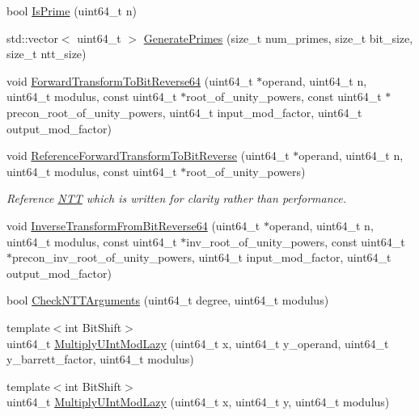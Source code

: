 \begin{DoxyCompactItemize}
bool \hyperlink{namespacehetest_1_1utils_a406b9fa0a830692fe69b04d2e9023858}{Is\-Prime} (uint64\-\_\-t n)
\item 
std\-::vector$<$ uint64\-\_\-t $>$ \hyperlink{namespacehetest_1_1utils_aa12bfb4bcbbd50266e460de87ee58cd5}{Generate\-Primes} (size\-\_\-t num\-\_\-primes, size\-\_\-t bit\-\_\-size, size\-\_\-t ntt\-\_\-size)
\item 
void \hyperlink{namespacehetest_1_1utils_a603d76eecc147f0388bfd3d4ed56a80e}{Forward\-Transform\-To\-Bit\-Reverse64} (uint64\-\_\-t $\ast$operand, uint64\-\_\-t n, uint64\-\_\-t modulus, const uint64\-\_\-t $\ast$root\-\_\-of\-\_\-unity\-\_\-powers, const uint64\-\_\-t $\ast$precon\-\_\-root\-\_\-of\-\_\-unity\-\_\-powers, uint64\-\_\-t input\-\_\-mod\-\_\-factor, uint64\-\_\-t output\-\_\-mod\-\_\-factor)
\item 
void \hyperlink{namespacehetest_1_1utils_a17097893112c25d41b68a2469e348c97}{Reference\-Forward\-Transform\-To\-Bit\-Reverse} (uint64\-\_\-t $\ast$operand, uint64\-\_\-t n, uint64\-\_\-t modulus, const uint64\-\_\-t $\ast$root\-\_\-of\-\_\-unity\-\_\-powers)
\begin{DoxyCompactList}\small\item\em Reference \hyperlink{classhetest_1_1utils_1_1NTT}{N\-T\-T} which is written for clarity rather than performance. \end{DoxyCompactList}\item 
void \hyperlink{namespacehetest_1_1utils_aab875bdc62d230db2837749ab27c3f4f}{Inverse\-Transform\-From\-Bit\-Reverse64} (uint64\-\_\-t $\ast$operand, uint64\-\_\-t n, uint64\-\_\-t modulus, const uint64\-\_\-t $\ast$inv\-\_\-root\-\_\-of\-\_\-unity\-\_\-powers, const uint64\-\_\-t $\ast$precon\-\_\-inv\-\_\-root\-\_\-of\-\_\-unity\-\_\-powers, uint64\-\_\-t input\-\_\-mod\-\_\-factor, uint64\-\_\-t output\-\_\-mod\-\_\-factor)
\item 
bool \hyperlink{namespacehetest_1_1utils_af721dbd58c61bb7b9220c8bb315488a9}{Check\-N\-T\-T\-Arguments} (uint64\-\_\-t degree, uint64\-\_\-t modulus)
\item 
{\footnotesize template$<$int Bit\-Shift$>$ }\\uint64\-\_\-t \hyperlink{namespacehetest_1_1utils_af874c3ebc0c27f720a19c5f8e4ea288c}{Multiply\-U\-Int\-Mod\-Lazy} (uint64\-\_\-t x, uint64\-\_\-t y\-\_\-operand, uint64\-\_\-t y\-\_\-barrett\-\_\-factor, uint64\-\_\-t modulus)
\item 
{\footnotesize template$<$int Bit\-Shift$>$ }\\uint64\-\_\-t \hyperlink{namespacehetest_1_1utils_a6d381530e44b937b604ee7f44c841a21}{Multiply\-U\-Int\-Mod\-Lazy} (uint64\-\_\-t x, uint64\-\_\-t y, uint64\-\_\-t modulus)

\end{DoxyCompactItemize}
